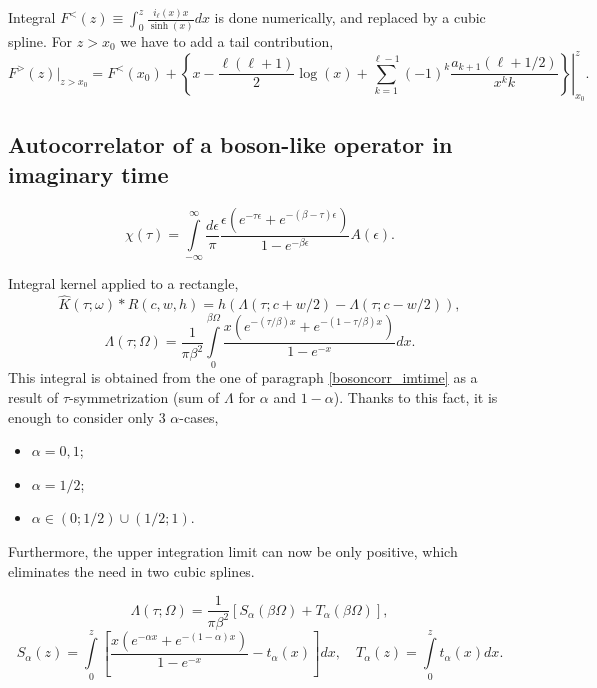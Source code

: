 \documentclass[]{article}
\begin{document}
Integral $F^<(z) \equiv \int_0^z \frac{i_\ell(x)x}{\sinh(x)} dx$ is done numerically,
and replaced by a cubic spline. For $z>x_0$ we have to add a tail contribution,
\begin{equation}
F^>(z)|_{z>x_0} = F^<(x_0) +
\left.\left\{
x - \frac{\ell(\ell+1)}{2}\log(x) +
\sum_{k=1}^{\ell-1} (-1)^k\frac{a_{k+1}(\ell+1/2)}{x^k k}
\right\}\right|_{x_0}^z.
\end{equation}

\subsection{Autocorrelator of a boson-like operator in imaginary time}
\label{bosonautocorr_imtime}
\begin{equation}
\chi(\tau) = \int\limits_{-\infty}^\infty \frac{d\epsilon}{\pi}
\frac{\epsilon (e^{-\tau\epsilon}+e^{-(\beta-\tau)\epsilon})}
{1-e^{-\beta\epsilon}} A(\epsilon).
\end{equation}

Integral kernel applied to a rectangle,
\begin{equation}
\hat K(\tau;\omega)*R(c,w,h) =
h(\Lambda(\tau;c+w/2) - \Lambda(\tau;c-w/2)),
\end{equation}
\begin{equation}
\Lambda(\tau;\Omega) = \frac{1}{\pi\beta^2}
\int\limits_0^{\beta\Omega}\frac{x(e^{-(\tau/\beta)x}+e^{-(1-\tau/\beta)x})}
{1-e^{-x}}dx.
\end{equation}
This integral is obtained from the one of paragraph \ref{bosoncorr_imtime}
as a result of $\tau$-symmetrization (sum of $\Lambda$ for $\alpha$ and $1-\alpha$).
Thanks to this fact, it is enough to consider only 3 $\alpha$-cases,
\begin{itemize}
	\item $\alpha=0,1$;
	\item $\alpha=1/2$;
	\item $\alpha\in(0;1/2)\cup(1/2;1)$.
\end{itemize}
Furthermore, the upper integration limit can now be only positive, which
eliminates the need in two cubic splines.

\begin{equation}
\Lambda(\tau;\Omega) = \frac{1}{\pi\beta^2} \left[
S_\alpha(\beta\Omega) + T_\alpha(\beta\Omega) \right],
\end{equation}
\begin{equation}
S_\alpha(z) = \int\limits_0^z
\left[\frac{x(e^{-\alpha x}+e^{-(1-\alpha)x})}{1-e^{-x}} - t_\alpha(x)
\right] dx, \quad
T_\alpha(z) = \int\limits_0^z t_\alpha(x) dx.
\end{equation}
\end{document}
